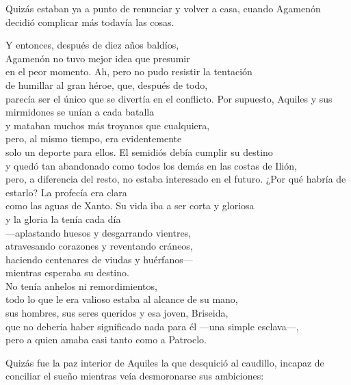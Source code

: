 Quizás estaban ya a punto de renunciar y volver a casa, cuando Agamenón decidió complicar más todavía las cosas.

\begin{versopropio}
Y entonces, después de diez años baldíos,\\
Agamenón no tuvo mejor idea que presumir\\
en el peor momento. Ah, pero no pudo resistir la tentación\\
de humillar al gran héroe, que, después de todo,\\
parecía ser el único que se divertía en el conflicto.
\stanzabreak
Por supuesto, Aquiles y sus mirmidones se unían a cada batalla\\
y mataban muchos más troyanos que cualquiera,\\
pero, al mismo tiempo, era evidentemente\\
solo un deporte para ellos. El semidiós debía cumplir su destino\\
y quedó tan abandonado como todos los demás en las costas de Ilión,\\
pero, a diferencia del resto, no estaba interesado en el futuro.
\stanzabreak
¿Por qué habría de estarlo? La profecía era clara\\
como las aguas de Xanto. Su vida iba a ser corta y gloriosa\\
y la gloria la tenía cada día\\
---aplastando huesos y desgarrando vientres,\\
atravesando corazones y reventando cráneos,\\
haciendo centenares de viudas y huérfanos---\\
mientras esperaba su destino.\\
No tenía anhelos ni remordimientos,\\
todo lo que le era valioso estaba al alcance de su mano,\\
sus hombres, sus seres queridos y esa joven, Briseida,\\
que no debería haber significado nada para él ---una simple esclava---,\\
pero a quien amaba casi tanto como a Patroclo.
\end{versopropio}

Quizás fue la paz interior de Aquiles la que desquició al caudillo, incapaz de conciliar el sueño mientras veía desmoronarse sus ambiciones:


